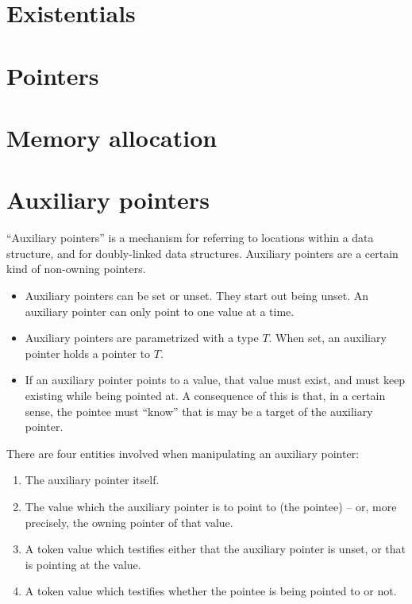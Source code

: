 \documentclass[a4paper]{book}
\begin{document}
\chapter{Existentials}

\chapter{Pointers}

\chapter{Memory allocation}


\chapter{Auxiliary pointers}
``Auxiliary pointers'' is a mechanism for referring to locations within
a data structure, and for doubly-linked data structures.
Auxiliary pointers are a certain kind of non-owning pointers.

\begin{itemize}
\item Auxiliary pointers can be set or unset. They start out being unset.
  An auxiliary pointer can only point to one value at a time.
\item Auxiliary pointers are parametrized with a type $T$.
  When set, an auxiliary pointer holds a pointer to $T$.
\item If an auxiliary pointer points to a value, that value must exist,
  and must keep existing while being pointed at.
  A consequence of this is that, in a certain sense, the pointee must ``know''
  that is may be a target of the auxiliary pointer.
\end{itemize}

\noindent
There are four entities involved when manipulating an auxiliary pointer:
\begin{enumerate}
\item The auxiliary pointer itself.
\item The value which the auxiliary pointer is to point to (the pointee) --
  or, more precisely, the owning pointer of that value.
\item A token value which testifies either that the auxiliary pointer is unset,
  or that is pointing at the value.
\item A token value which testifies whether the pointee is being
  pointed to or not.
\end{enumerate}
\end{document}
